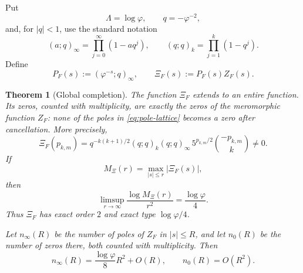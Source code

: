 \documentclass[11pt]{article}
\newtheorem{theorem}{Theorem}[section]
\theoremstyle{remark}
\newcommand{\ZF}{Z_F}
\begin{document}
Put
\[
\Lambda=\log\varphi,
\qquad
q=-\varphi^{-2},
\]
and, for $|q|<1$, use the standard notation
\[
(a;q)_\infty=\prod_{j=0}^{\infty}(1-aq^j),
\qquad
(q;q)_k=\prod_{j=1}^{k}(1-q^j).
\]
Define
\begin{equation}\label{eq:completion-def}
P_F(s):=(\varphi^{-s};q)_\infty,
\qquad
\Xi_F(s):=P_F(s)\ZF(s).
\end{equation}

\begin{theorem}[Global completion]\label{thm:completion}
The function $\Xi_F$ extends to an entire function.  Its zeros, counted with multiplicity, are exactly the zeros of the meromorphic function $\ZF$: none of the poles in \eqref{eq:pole-lattice} becomes a zero after cancellation.  More precisely,
\begin{equation}\label{eq:completion-pole-value}
\Xi_F(p_{k,m})
=q^{-k(k+1)/2}(q;q)_k(q;q)_\infty
\,5^{p_{k,m}/2}\binom{-p_{k,m}}{k}\neq0.
\end{equation}
If
\[
M_\Xi(r)=\max_{|s|\le r}|\Xi_F(s)|,
\]
then
\begin{equation}\label{eq:completion-type}
\limsup_{r\to\infty}\frac{\log M_\Xi(r)}{r^2}
=\frac{\log\varphi}{4}.
\end{equation}
Thus $\Xi_F$ has exact order $2$ and exact type $\log\varphi/4$.

Let $n_\infty(R)$ be the number of poles of $\ZF$ in $|s|\le R$, and let $n_0(R)$ be the number of zeros there, both counted with multiplicity.  Then
\begin{equation}\label{eq:global-counting}
n_\infty(R)
=\frac{\log\varphi}{8}R^2+O(R),
\qquad
n_0(R)=O(R^2).
\end{equation}
\end{theorem}
\end{document}
